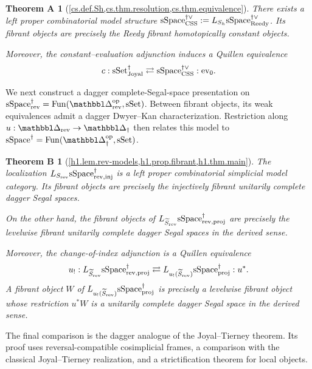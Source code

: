 \documentclass[a4paper,dvipdfmx,11pt]{amsart}
\newtheorem*{maintheorema}{Theorem A}
\newtheorem*{maintheoremb}{Theorem B}
\begin{document}
\begin{maintheorema}[\cref{cs.def.Sh,cs.thm.resolution,cs.thm.equivalence}]
  There exists a left proper combinatorial model structure $\mathrm{sSpace}^{\dag\vee}_{\mathrm{CSS}}:=L_{S_h}\mathrm{sSpace}^{\dag\vee}_{\mathrm{Reedy}}$.
  Its fibrant objects are precisely the Reedy fibrant homotopically constant objects.
  
  Moreover, the constant--evaluation adjunction induces a Quillen equivalence
  \begin{align}
    c:
    \mathrm{sSet}^{\dag}_{\mathrm{Joyal}}
    \rightleftarrows
    \mathrm{sSpace}^{\dag\vee}_{\mathrm{CSS}}
    :\mathrm{ev}_0.
  \end{align}
\end{maintheorema}

We next construct a dagger complete-Segal-space presentation on $\sSpace^{\dag}_{\rev}=\Fun(\prism_{\rev}^{\myop},\sSet)$.
Between fibrant objects, its weak equivalences admit a dagger Dwyer--Kan characterization.
Restriction along $u:\prism_{\rev}\to\prism_{\dag}$ then relates this model to $\sSpace^{\dag}=\Fun(\prism_{\dag}^{\myop},\sSet)$.

\begin{maintheoremb}[\cref{h1.lem.rev-models,h1.prop.fibrant,h1.thm.main}]
  The localization $L_{S_{\mathrm{rev}}}\mathrm{sSpace}^{\dag}_{\mathrm{rev},\mathrm{inj}}$ is a left proper combinatorial simplicial model category.
  Its fibrant objects are precisely the injectively fibrant unitarily complete dagger Segal spaces.
  
  On the other hand, the fibrant objects of $L_{\widetilde S_{\mathrm{rev}}}\mathrm{sSpace}^{\dag}_{\mathrm{rev},\mathrm{proj}}$ are precisely the levelwise fibrant unitarily complete dagger Segal spaces in the derived sense.
  
  Moreover, the change-of-index adjunction is a Quillen equivalence
  \begin{align}
    u_{!}:
    L_{\widetilde S_{\mathrm{rev}}}\mathrm{sSpace}^{\dag}_{\mathrm{rev},\mathrm{proj}}
    \rightleftarrows
    L_{u_{!}(\widetilde S_{\mathrm{rev}})}\mathrm{sSpace}^{\dag}_{\mathrm{proj}}
    :u^{*}.
  \end{align}
  A fibrant object $W$ of $L_{u_{!}(\widetilde S_{\mathrm{rev}})}\mathrm{sSpace}^{\dag}_{\mathrm{proj}}$ is precisely a levelwise fibrant object whose restriction $u^{*}W$ is a unitarily complete dagger Segal space in the derived sense.
\end{maintheoremb}

The final comparison is the dagger analogue of the Joyal--Tierney theorem.
Its proof uses reversal-compatible cosimplicial frames, a comparison with the classical Joyal--Tierney realization, and a strictification theorem for local objects.
\end{document}
